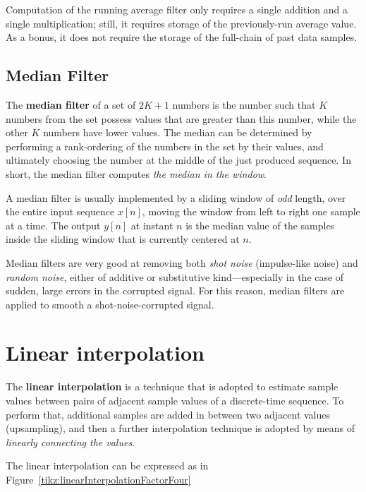 \documentclass[\documentfontsize, twocolumn]{\classname}
\begin{document}
Computation of the running average filter only requires a single addition and a single multiplication; still, it requires storage of the previously-run average value. As a bonus, it does not require the storage of the full-chain of past data samples.

\subsection{Median Filter}

The \textbf{median filter} of a set of $2K+1$ numbers is the number such that $K$ numbers from the set possess values that are greater than this number, while the other $K$ numbers have lower values. The median can be determined by performing a rank-ordering of the numbers in the set by their values, and ultimately choosing the number at the middle of the just produced sequence. In short, the median filter computes \emph{the median in the window}.

A median filter is usually implemented by a sliding window of \emph{odd} length, over the entire input sequence $x[n]$, moving the window from left to right one sample at a time. The output $y[n]$ at instant $n$ is the median value of the samples inside the sliding window that is currently centered at $n$.

Median filters are very good at removing both \emph{shot noise} (impulse-like noise) and \emph{random noise}, either of additive or substitutive kind---especially in the case of sudden, large errors in the corrupted signal. For this reason, median filters are applied to smooth a shot-noise-corrupted signal.


\section{Linear interpolation}

The \textbf{linear interpolation} is a technique that is adopted to estimate sample values between pairs of adjacent sample values of a discrete-time sequence. To perform that, additional samples are added in between two adjacent values (upsampling), and then a further interpolation technique is adopted by means of \emph{linearly connecting the values}.

The linear interpolation can be expressed as in Figure~\ref{tikz:linearInterpolationFactorFour}
\end{document}
